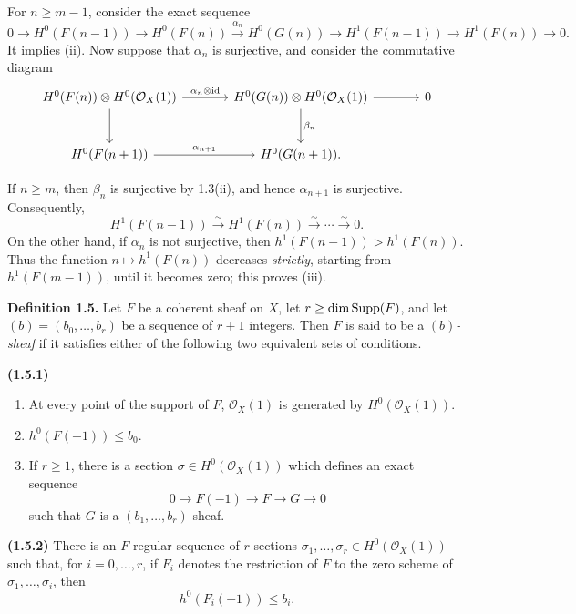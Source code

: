 For \(n\geq m-1\), consider the exact sequence
\[
  0\to H^0(F(n-1))\to H^0(F(n))
  \xrightarrow{\alpha_n}H^0(G(n))\to H^1(F(n-1))
  \to H^1(F(n))\to0.
\]
It implies (ii). Now suppose that \(\alpha_n\) is surjective, and consider
the commutative diagram
\[
\begin{tikzcd}[column sep=large,row sep=large]
H^0(F(n))\otimes H^0(\mathcal O_X(1))
  \arrow[r,"\alpha_n\otimes\mathrm{id}"]
  \arrow[d]
& H^0(G(n))\otimes H^0(\mathcal O_X(1))
  \arrow[r]
  \arrow[d,"\beta_n"]
& 0 \\
H^0(F(n+1))
  \arrow[r,"\alpha_{n+1}"]
& H^0(G(n+1)).
\end{tikzcd}
\]

\newpage
If \(n\geq m\), then \(\beta_n\) is surjective by 1.3(ii), and hence
\(\alpha_{n+1}\) is surjective. Consequently,
\[
  H^1(F(n-1))\xrightarrow{\sim}H^1(F(n))
  \xrightarrow{\sim}\cdots\xrightarrow{\sim}0.
\]
On the other hand, if \(\alpha_n\) is not surjective, then
\(h^1(F(n-1))>h^1(F(n))\). Thus the function
\(n\longmapsto h^1(F(n))\) decreases \emph{strictly}, starting from
\(h^1(F(m-1))\), until it becomes zero; this proves (iii).

\textbf{Definition 1.5.} Let \(F\) be a coherent sheaf on \(X\), let
\(r\geq\dim\operatorname{Supp}(F)\), and let \((b)=(b_0,\ldots,b_r)\) be a sequence of
\(r+1\) integers. Then \(F\) is said to be a \emph{\((b)\)-sheaf} if it
satisfies either of the following two equivalent sets of conditions.

\noindent\textbf{(1.5.1)}
\begin{enumerate}[label=(\roman*)]
\item At every point of the support of \(F\), \(\mathcal O_X(1)\) is
generated by \(H^0(\mathcal O_X(1))\).
\item \(h^0(F(-1))\leq b_0\).
\item If \(r\geq1\), there is a section
\(\sigma\in H^0(\mathcal O_X(1))\) which defines an exact sequence
\[
  0\longrightarrow F(-1)\longrightarrow F\longrightarrow G\longrightarrow0
\]
such that \(G\) is a \((b_1,\ldots,b_r)\)-sheaf.
\end{enumerate}

\noindent\textbf{(1.5.2)} There is an \(F\)-regular sequence of \(r\)
sections \(\sigma_1,\ldots,\sigma_r\in H^0(\mathcal O_X(1))\) such that,
for \(i=0,\ldots,r\), if \(F_i\) denotes the restriction of \(F\) to the
zero scheme of \(\sigma_1,\ldots,\sigma_i\), then
\[
  h^0(F_i(-1))\leq b_i.
\]


